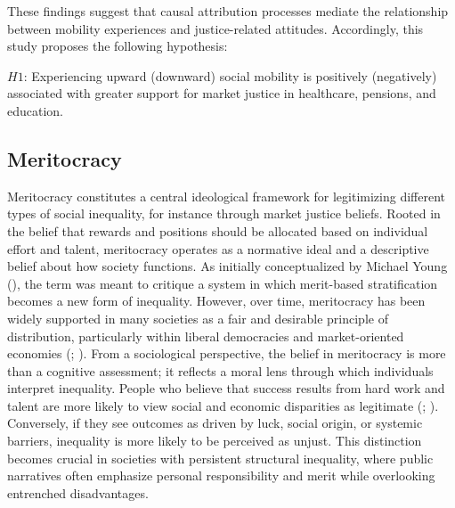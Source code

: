 \documentclass[
  12pt,
]{article}
\begin{document}
These findings suggest that causal attribution processes mediate the
relationship between mobility experiences and justice-related attitudes.
Accordingly, this study proposes the following hypothesis:

\(H1\): Experiencing upward (downward) social mobility is positively
(negatively) associated with greater support for market justice in
healthcare, pensions, and education.

\subsection{Meritocracy}\label{meritocracy}

Meritocracy constitutes a central ideological framework for legitimizing
different types of social inequality, for instance through market
justice beliefs. Rooted in the belief that rewards and positions should
be allocated based on individual effort and talent, meritocracy operates
as a normative ideal and a descriptive belief about how society
functions. As initially conceptualized by Michael Young
(), the term was meant to critique a
system in which merit-based stratification becomes a new form of
inequality. However, over time, meritocracy has been widely supported in
many societies as a fair and desirable principle of distribution,
particularly within liberal democracies and market-oriented economies
(;
). From a sociological
perspective, the belief in meritocracy is more than a cognitive
assessment; it reflects a moral lens through which individuals interpret
inequality. People who believe that success results from hard work and
talent are more likely to view social and economic disparities as
legitimate (;
).
Conversely, if they see outcomes as driven by luck, social origin, or
systemic barriers, inequality is more likely to be perceived as unjust.
This distinction becomes crucial in societies with persistent structural
inequality, where public narratives often emphasize personal
responsibility and merit while overlooking entrenched disadvantages.
\end{document}
